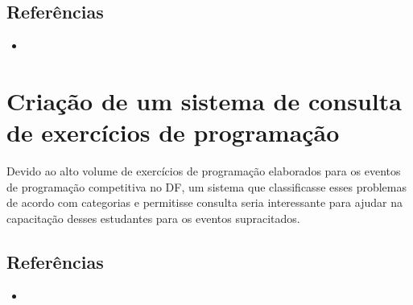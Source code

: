 \documentclass{article}
\begin{document}
\subsection*{Referências}

\begin{itemize}
	\item {}
\end{itemize}


\section*{Criação de um sistema de consulta de exercícios de programação}

Devido ao alto volume de exercícios de programação elaborados para os eventos de programação competitiva no DF, um sistema que classificasse esses problemas de acordo com categorias e permitisse consulta seria interessante para ajudar na capacitação desses estudantes para os eventos supracitados.

\subsection*{Referências}

\begin{itemize}
	\item {}
\end{itemize}
\end{document}

